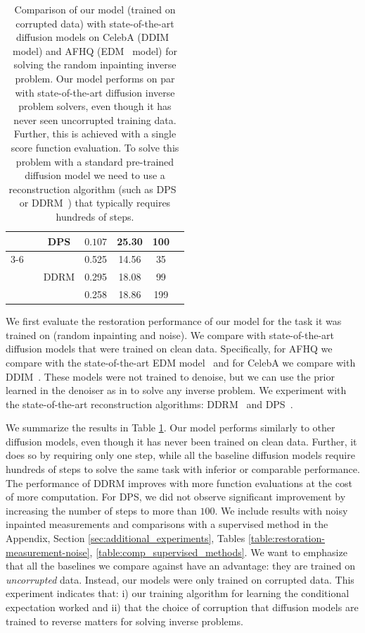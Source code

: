 \documentclass{article}
\begin{document}
\begin{table}[!htp]
\begin{tabular}{@{}cc|ccccc@{}}
&  & DPS & $\bm{0.107}$ & 25.30 & 100\\  \cline{3-6}
&  & \multirow{3}{*}{DDRM} & 0.525 & 14.56 & 35\\
&  &  & 0.295 & 18.08 & 99\\
&  &  & 0.258 & 18.86 & 199\\
\end{tabular}
\caption{Comparison of our model (trained on corrupted data) with state-of-the-art diffusion models on CelebA (DDIM~\citep{ddim} model) and AFHQ (EDM~\citep{karras2022elucidating} model) for solving the random inpainting inverse problem. Our model performs on par with state-of-the-art diffusion inverse problem solvers, even though it has never seen uncorrupted training data. Further, this is achieved with a single score function evaluation. To solve this problem with a standard pre-trained diffusion model we need to use a reconstruction algorithm (such as DPS~\citep{dps} or DDRM~\citep{ddrm}) that typically requires hundreds of steps.}
\label{table:restoration}
\end{table}


We first evaluate the restoration performance of our model for the task it was trained on (random inpainting and noise). We compare with state-of-the-art diffusion models that were trained on clean data. Specifically, for AFHQ we compare with the state-of-the-art EDM model~\citep{karras2022elucidating} and for CelebA we compare with DDIM~\citep{ddim}. These models were not trained to denoise, but we can use the prior learned in the denoiser as in \citep{pnp, kadkhodaie2020solving} to solve any inverse problem. We experiment with the state-of-the-art reconstruction algorithms: DDRM~\citep{ddrm} and DPS~\cite{dps}. 

We summarize the results in Table \ref{table:restoration}. Our model performs similarly to other diffusion models, even though it has never been trained on clean data. Further, it does so by requiring only one step, while all the baseline diffusion models require hundreds of steps to solve the same task with inferior or comparable performance.  The performance of DDRM improves with more function evaluations at the cost of more computation. For DPS, we did not observe significant improvement by increasing the number of steps to more than $100$. We include results with noisy inpainted measurements and comparisons with a supervised method in the Appendix, Section \ref{sec:additional_experiments}, Tables \ref{table:restoration-measurement-noise}, \ref{table:comp_supervised_methods}.
We want to emphasize that all the baselines we compare against have an advantage: they are trained on \textit{uncorrupted} data. Instead, our models were only trained on corrupted data. This experiment indicates that: i) our training algorithm for learning the conditional expectation worked and ii) that the choice of corruption that diffusion models are trained to reverse matters for solving inverse problems.
\end{document}
